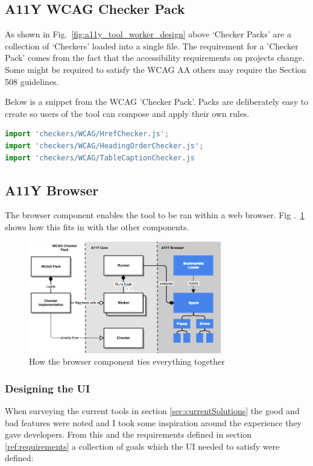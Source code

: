 \subsection{A11Y WCAG Checker Pack}
As shown in Fig.~\ref{fig:a11y_tool_worker_design} above `Checker Packs' are
a collection of `Checkers' loaded into a single file. The requirement for a
'Checker Pack' comes from the fact that the accessibility requirements on
projects change. Some might be required to satisfy the WCAG AA others may
require the Section 508 guidelines.

Below is a snippet from the WCAG 'Checker Pack'. Packs are deliberately easy to
create so users of the tool can compose and apply their own rules.

\begin{lstlisting}[language=JavaScript]
import 'checkers/WCAG/HrefChecker.js';
import 'checkers/WCAG/HeadingOrderChecker.js';
import 'checkers/WCAG/TableCaptionChecker.js
\end{lstlisting}

\subsection{A11Y Browser}
The browser component enables the tool to be ran within a web browser. Fig
.~\ref{fig:a11y_tool_browser_design} shows how this fits in with the other
components.

\begin{figure}[H]
\centering
\includegraphics[width=0.75\textwidth]{figures/a11y_tool_browser_design}
\captionsetup{justification=centering}
\caption{How the browser component ties everything together
\label{fig:a11y_tool_browser_design}}
\end{figure}

\subsubsection{Designing the UI}
When surveying the current tools in section \ref{sec:currentSolutions}
the good and bad features were noted and I took some inspiration around
the experience they gave developers. From this and the requirements defined
in section \ref{ref:requirements} a collection of goals which the UI needed
to satisfy were defined:


